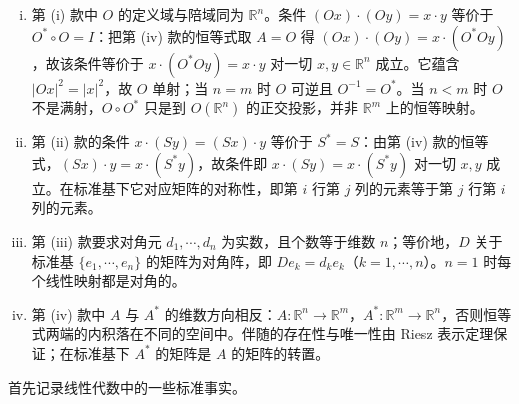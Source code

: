 \documentclass[../../main.tex]{subfiles}%
\begin{document}
\begin{remark}\label{remark:ch03-def-3-3-条件}
\begin{enumerate}[(i)]
\item 第 (i) 款中 $O$ 的定义域与陪域同为 $\mathbb{R}^n$。条件 $(Ox)\cdot(Oy)=x\cdot y$ 等价于 $O^*\circ O=I$：把第 (iv) 款的恒等式取 $A=O$ 得 $(Ox)\cdot(Oy)=x\cdot(O^*Oy)$，故该条件等价于 $x\cdot(O^*Oy)=x\cdot y$ 对一切 $x,y\in\mathbb{R}^n$ 成立。它蕴含 $\lvert Ox\rvert^2=\lvert x\rvert^2$，故 $O$ 单射；当 $n=m$ 时 $O$ 可逆且 $O^{-1}=O^*$。当 $n<m$ 时 $O$ 不是满射，$O\circ O^*$ 只是到 $O(\mathbb{R}^n)$ 的正交投影，并非 $\mathbb{R}^m$ 上的恒等映射。
\item 第 (ii) 款的条件 $x\cdot(Sy)=(Sx)\cdot y$ 等价于 $S^*=S$：由第 (iv) 款的恒等式，$(Sx)\cdot y=x\cdot(S^*y)$，故条件即 $x\cdot(Sy)=x\cdot(S^*y)$ 对一切 $x,y$ 成立。在标准基下它对应矩阵的对称性，即第 $i$ 行第 $j$ 列的元素等于第 $j$ 行第 $i$ 列的元素。
\item 第 (iii) 款要求对角元 $d_1,\cdots,d_n$ 为实数，且个数等于维数 $n$；等价地，$D$ 关于标准基 $\{e_1,\cdots,e_n\}$ 的矩阵为对角阵，即 $De_k=d_ke_k$（$k=1,\cdots,n$）。$n=1$ 时每个线性映射都是对角的。
\item 第 (iv) 款中 $A$ 与 $A^*$ 的维数方向相反：$A:\mathbb{R}^n\to\mathbb{R}^m$，$A^*:\mathbb{R}^m\to\mathbb{R}^n$，否则恒等式两端的内积落在不同的空间中。伴随的存在性与唯一性由 Riesz 表示定理保证；在标准基下 $A^*$ 的矩阵是 $A$ 的矩阵的转置。
\end{enumerate}
\end{remark}

首先记录线性代数中的一些标准事实。
\end{document}

